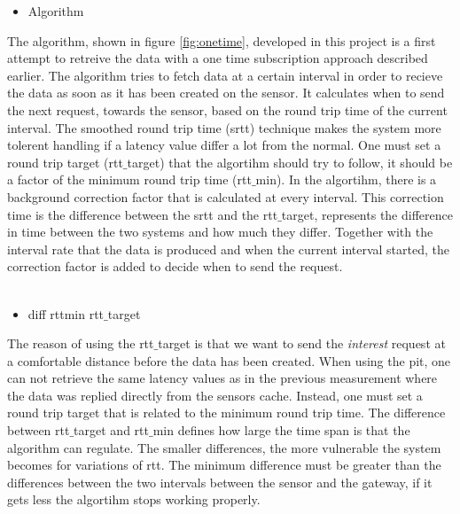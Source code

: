 \begin{itemize}
\item Algorithm
\end{itemize}
The algorithm, shown in figure \ref{fig:onetime}, developed in this project is a first attempt to retreive the data with a one time subscription approach described earlier. 
The algorithm tries to fetch data at a certain interval in order to recieve the data as soon as it has been created on the sensor. It calculates when to send the next request, towards the sensor, based on the round trip time of the current interval. The smoothed round trip time (srtt) technique makes the system more tolerent handling if a latency value differ a lot from the normal. One must set a round trip target (rtt$\_$target) that the algortihm should try to follow, it should be a factor of the minimum round trip time (rtt$\_$min). In the algortihm, there is a background correction factor that is calculated at every interval. This correction time is the difference between the srtt and the rtt$\_$target, represents the difference in time between the two systems and how much they differ. Together with the interval rate that the data is produced and when the current interval started, the correction factor is added to decide when to send the request. \\\\


\begin{itemize}
\item diff rttmin rtt$\_$target
\end{itemize}
The reason of using the rtt$\_$target is that we want to send the \textit{interest} request at a comfortable distance before the data has been created.
When using the pit, one can not retrieve the same latency values as in the previous measurement where the data was replied directly from the sensors cache. Instead, one must set a round trip target that is related to the minimum round trip time. The difference between rtt$\_$target and rtt$\_$min defines how large the time span is that the algorithm can regulate. The smaller differences, the more vulnerable the system becomes for variations of rtt. The minimum difference must be greater than the differences between the two intervals between the sensor and the gateway, if it gets less the algortihm stops working properly.


